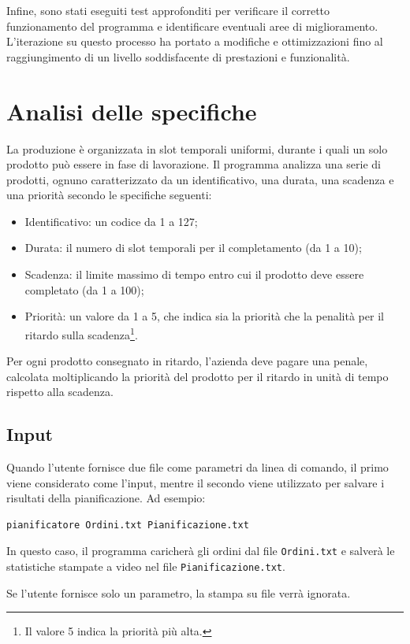 \documentclass[a4paper]{report}
\begin{document}
Infine, sono stati eseguiti test approfonditi per verificare il corretto
funzionamento del programma e identificare eventuali aree di miglioramento.
L'iterazione su questo processo ha portato a modifiche e ottimizzazioni
fino al raggiungimento di un livello soddisfacente di prestazioni e funzionalità.

\section{Analisi delle specifiche}
La produzione è organizzata in slot temporali uniformi, durante i quali un solo prodotto può essere in fase di lavorazione.
Il programma analizza una serie di prodotti, ognuno caratterizzato da un identificativo, una durata, una scadenza e una priorità secondo le specifiche seguenti:
\begin{itemize}
    \item Identificativo: un codice da 1 a 127;
    \item Durata: il numero di slot temporali per il completamento (da 1 a 10);
    \item Scadenza: il limite massimo di tempo entro cui il prodotto deve essere completato (da 1 a 100);
    \item Priorità: un valore da 1 a 5, che indica sia la priorità che la penalità per il ritardo sulla scadenza\footnote{Il valore 5 indica la priorità più alta.}.
\end{itemize}
Per ogni prodotto consegnato in ritardo, l'azienda deve pagare una penale, calcolata moltiplicando la priorità del prodotto per il ritardo in unità di tempo rispetto alla scadenza.

\subsection{Input}
Quando l'utente fornisce due file come parametri da linea di comando, il primo viene considerato come l'input, mentre il secondo viene utilizzato per salvare i risultati della pianificazione. Ad esempio:

\begin{verbatim}
pianificatore Ordini.txt Pianificazione.txt
\end{verbatim}

In questo caso, il programma caricherà gli ordini dal file \texttt{Ordini.txt} e salverà le statistiche stampate a video nel file \texttt{Pianificazione.txt}.

Se l'utente fornisce solo un parametro, la stampa su file verrà ignorata.
\end{document}
